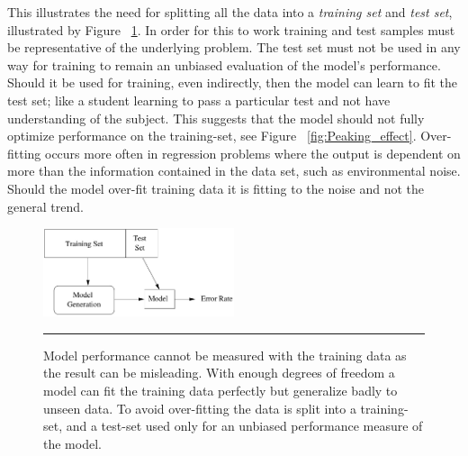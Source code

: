 This illustrates the need for splitting all the data into a \textit{training set} and \textit{test set}, illustrated by Figure ~\ref{fig:Training_and_Test}.
In order for this to work training and test samples must be representative of the underlying problem.
The test set must not be used in any way for training to remain an unbiased evaluation of the model's performance.
Should it be used for training, even indirectly, then the model can learn to fit the test set; like a student learning to pass a particular test and not have understanding of the subject.
This suggests that the model should not fully optimize performance on the training-set, see Figure ~\ref{fig:Peaking_effect}.
Over-fitting occurs more often in regression problems where the output is dependent on more than the information contained in the data set, such as environmental noise.
Should the model over-fit training data it is fitting to the noise and not the general trend.

\begin{figure}[htbp]
	\centering
		\includegraphics[width = 0.5\textwidth]{./Figures/training_and_test_sets_Mining.jpg}
		\rule{35em}{0.5pt}
	\caption[Model Training and Testing]{Model performance cannot be measured  with the training data as the result can be misleading. With enough degrees of freedom a model can fit the training data perfectly but generalize badly to unseen data. To avoid over-fitting the data is split into a training-set, and a test-set used only for an unbiased performance measure of the model.}
	\label{fig:Training_and_Test}
\end{figure}

